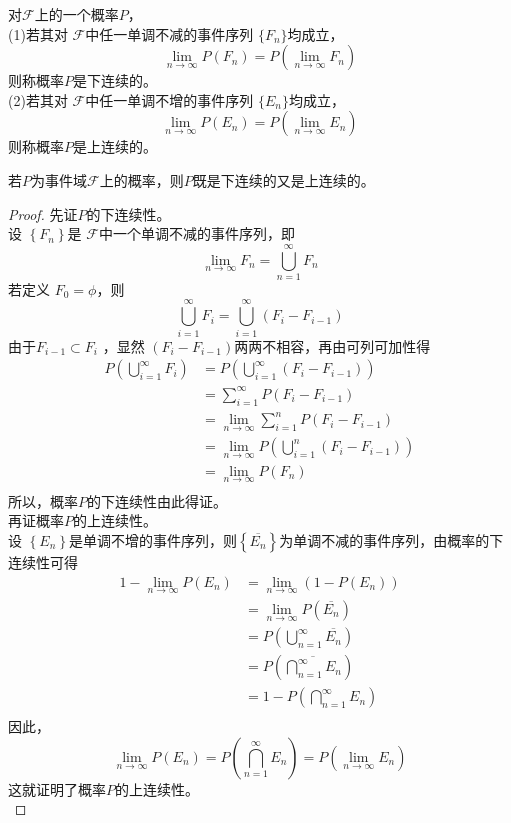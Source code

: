     \begin{definition}[上、下连续] \label{def:continuity} 
    对$\mathcal{F}$上的一个概率$P$，\\
    (1)若其对 $\mathcal{F}$中任一单调不减的事件序列 $\{F_{n}\}$均成立，$$\lim_{n \to \infty} P(F_{n} )=P(\lim_{n \to \infty}F_{n}  )$$
    则称概率$P$是下连续的。\\
    (2)若其对 $\mathcal{F}$中任一单调不增的事件序列 $\{E_{n}\}$均成立，$$\lim_{n \to \infty} P(E_{n} )=P(\lim_{n \to \infty}E_{n}  )$$
    则称概率$P$是上连续的。
  \end{definition}

\begin{theorem}[概率的连续性]\label{thm:chap01_probabilty_continuity}
若$P$为事件域$\mathcal{F}$上的概率，则$P$既是下连续的又是上连续的。
\end{theorem}

\begin{proof}
先证$P$的下连续性。\\
设 $\left \{ F_{n}  \right \} $是 $\mathcal{F}$中一个单调不减的事件序列，即$$\lim_{n \to \infty} F_{n} =\bigcup_{n=1}^{\infty } F_{n}$$
若定义 $F_{0} =\phi $，则$$\bigcup_{i=1}^{\infty } F_{i}=\bigcup_{i=1}^{\infty }(F_{i}-F_{i-1})$$
由于$F_{i-1} \subset F_{i}$ ，显然 $\left (  F_{i}-F_{i-1}  \right ) $两两不相容，再由可列可加性得
\begin{equation}
  \begin{aligned}
   P(\bigcup_{i=1}^{\infty }F_{i}  )
   &=P(\bigcup_{i=1}^{\infty }(F_{i}-F_{i-1})) \\
   &=\sum_{i=1}^{\infty } P(F_{i}-F_{i-1}) \\
   &=\lim_{n\to \infty} \sum_{i=1}^{n } P(F_{i}-F_{i-1})\\
   &=\lim_{n\to \infty} P( \bigcup_{i=1}^{n}  (F_{i}-F_{i-1}  ) )\\
   &=\lim_{n\to \infty} P( F_{n} )\\
  \end{aligned}
\end{equation}
所以，概率$P$的下连续性由此得证。\\
再证概率$P$的上连续性。\\
设 $\left \{ E_{n}  \right \} $是单调不增的事件序列，则$\left \{ \overline{E_{n} }  \right \} $为单调不减的事件序列，由概率的下连续性可得
\begin{equation}
  \begin{aligned}
   1-\lim_{n\to \infty} P(E_{n} )
   &=\lim_{n\to \infty } (1-P(E_{n}))\\
   &=\lim_{n\to \infty } P(\overline{E_{n} } )\\
   &=P(\bigcup_{n=1}^{\infty } \overline{E_{n} } )\\
   &=P(\overline{\bigcap_{n=1}^{\infty } E_{n} }  )\\
   &=1-P(\bigcap_{n=1}^{\infty } E_{n}   )\\
  \end{aligned}
\end{equation}
因此，$$\lim_{n \to \infty} P(E_{n} )=P(\bigcap_{n=1}^{\infty } E_{n} )=P(\lim_{n \to \infty}E_{n} )$$
这就证明了概率$P$的上连续性。\\
\end{proof}

